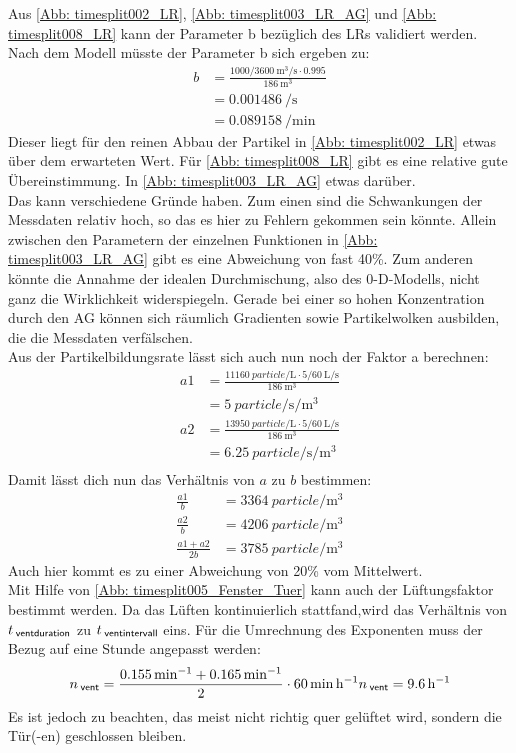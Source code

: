 \documentclass[12pt,a4paper,bibtotocnumbered,liststotocnumbered]{scrreprt}
\begin{document}
Aus \autoref{Abb: timesplit002_LR}, \ref{Abb: timesplit003_LR_AG} und \ref{Abb: timesplit008_LR} kann der Parameter b bezüglich des \acp{LR} validiert werden. Nach dem Modell müsste der Parameter b sich ergeben zu:
\begin{align}
b &= \frac{1000/\SI{3600}{\cubic\meter\per\second}   \cdot  0.995}{\SI{186}{\cubic\meter}}\\
&= \SI{0.001486}{\per\second} \\
&= \SI{0.089158}{\per\minute}
\end{align}
Dieser liegt für den reinen Abbau der Partikel in  \autoref{Abb: timesplit002_LR} etwas über dem erwarteten Wert. Für  \autoref{Abb: timesplit008_LR} gibt es eine relative gute Übereinstimmung. In \autoref{Abb: timesplit003_LR_AG} etwas darüber. \\
Das kann verschiedene Gründe haben. Zum einen sind die Schwankungen der Messdaten relativ hoch, so das es hier zu Fehlern gekommen sein könnte. Allein zwischen den Parametern der einzelnen Funktionen in \autoref{Abb: timesplit003_LR_AG} gibt es eine Abweichung von fast 40\%. Zum anderen könnte die Annahme der idealen Durchmischung, also des 0-D-Modells, nicht ganz die Wirklichkeit widerspiegeln. Gerade bei einer so hohen Konzentration durch den \ac{AG} können sich räumlich Gradienten sowie Partikelwolken ausbilden, die die Messdaten verfälschen.\\
Aus der Partikelbildungsrate lässt sich auch nun noch der Faktor a berechnen:
\begin{align}
a1 &= \frac{\SI{11160}{particle\per\liter}   \cdot   5/\SI{60}{\liter\per\second}}{\SI{186}{\cubic\meter}}\\
&= \SI{5}{particle\per\second\per\cubic\meter} \\
a2 &= \frac{\SI{13950}{particle\per\liter}   \cdot   5/\SI{60}{\liter\per\second}}{\SI{186}{\cubic\meter}}\\
&= \SI{6.25}{particle\per\second\per\cubic\meter} \\
\end{align}
Damit lässt dich nun das Verhältnis von $a$ zu $b$ bestimmen:
\begin{align}
\frac{a1}{b} &=   \SI{3364}{particle\per\cubic\meter} \\
\frac{a2}{b} &=   \SI{4206}{particle\per\cubic\meter}  \\
\frac{a1 + a2}{2 b} &=   \SI{3785}{particle\per\cubic\meter} 
\end{align}
Auch hier kommt es zu einer Abweichung von 20\% vom Mittelwert.\\
Mit Hilfe von \autoref{Abb: timesplit005_Fenster_Tuer} kann auch der Lüftungsfaktor bestimmt werden. Da das Lüften kontinuierlich stattfand,wird das Verhältnis von $t_{\: \mathsf{ventduration}}$ zu $t_{\: \mathsf{ventintervall}}$ eins. Für die Umrechnung des Exponenten muss der Bezug auf eine Stunde angepasst werden:
\begin{align}
n_{\: \mathsf{vent}} = \frac{\SI{0.155}{\per\minute} + \SI{0.165}{\per\minute}}{2} \cdot \SI{60}{\minute\per\hour}
n_{\: \mathsf{vent}} = \SI{9.6}{\per\hour}
\end{align}
Es ist jedoch zu beachten, das meist nicht richtig quer gelüftet wird, sondern die Tür(-en) geschlossen bleiben.



\newpage
\RaggedRight



\listoffigures

\listoftables
\end{document}
